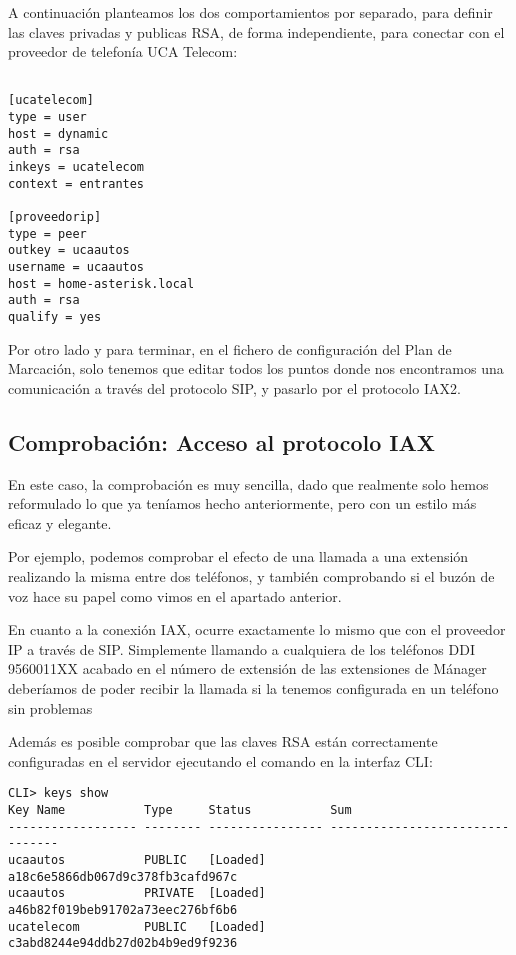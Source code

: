 A continuación planteamos los dos comportamientos por separado, para definir las claves privadas y publicas RSA, de forma independiente, para conectar con el proveedor de telefonía UCA Telecom:

\begin{lstlisting}[style=bash,title={/etc/asterisk/iax.conf}]

[ucatelecom]
type = user
host = dynamic
auth = rsa
inkeys = ucatelecom
context = entrantes

[proveedorip]
type = peer
outkey = ucaautos
username = ucaautos
host = home-asterisk.local
auth = rsa
qualify = yes

\end{lstlisting}

Por otro lado y para terminar, en el fichero de configuración del Plan de Marcación, solo tenemos que editar todos los puntos donde nos encontramos una comunicación a través del protocolo SIP, y pasarlo por el protocolo IAX2. 

\subsection{Comprobación: Acceso al protocolo IAX}

En este caso, la comprobación es muy sencilla, dado que realmente solo hemos reformulado lo que ya teníamos hecho anteriormente, pero con un estilo más eficaz y elegante. 

Por ejemplo, podemos comprobar el efecto de una llamada a una extensión realizando la misma entre dos teléfonos, y también comprobando si el buzón de voz hace su papel como vimos en el apartado anterior.

En cuanto a la conexión IAX, ocurre exactamente lo mismo que con el proveedor IP a través de SIP. Simplemente llamando a cualquiera de los teléfonos DDI 9560011XX acabado en el número de extensión de las extensiones de Mánager deberíamos de poder recibir la llamada si la tenemos configurada en un teléfono sin problemas

Además es posible comprobar que las claves RSA están correctamente configuradas en el servidor ejecutando el comando en la interfaz CLI:

\begin{lstlisting}[style=consola]
CLI> keys show
Key Name           Type     Status           Sum
------------------ -------- ---------------- --------------------------------
ucaautos           PUBLIC   [Loaded]         a18c6e5866db067d9c378fb3cafd967c
ucaautos           PRIVATE  [Loaded]         a46b82f019beb91702a73eec276bf6b6
ucatelecom         PUBLIC   [Loaded]         c3abd8244e94ddb27d02b4b9ed9f9236
\end{lstlisting}

